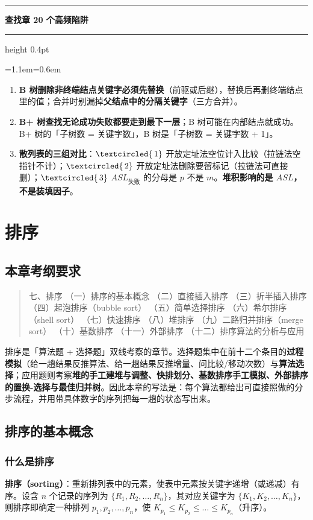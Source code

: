 \documentclass[11pt,openany,UTF8]{ctexbook}
\newcommand{\circled}[1]{\textcircled{\scriptsize\,#1}}
\newcommand{\callouthead}[2]{%
  \par\addvspace{7pt}\noindent
  {\color{#1}\rule[-0.15em]{3pt}{1.05em}}\hspace{0.5em}%
  {\bfseries\color{#1}#2}\par\nobreak\vspace{-0.35em}%
  {\color{rulesep}\hrule height 0.4pt}\nobreak\vspace{0.45em}%
  \begingroup\small\setlength{\parindent}{0pt}%
  \leftskip=1.1em\rightskip=0.6em\noindent\ignorespaces}
\newcommand{\calloutend}{\par\endgroup\addvspace{7pt}}
\newenvironment{callwarn}[1]{\callouthead{warnbar}{#1}}{\calloutend}
\begin{document}
\begin{callwarn}{查找章 20 个高频陷阱}
\begin{enumerate}
\item \textbf{B 树删除非终端结点关键字必须先替换}（前驱或后继），替换后再删终端结点里的值；合并时别漏掉\textbf{父结点中的分隔关键字}（三方合并）。
\item \textbf{B+ 树查找无论成功失败都要走到最下一层}；B 树可能在内部结点就成功。B+ 树的「子树数 = 关键字数」，B 树是「子树数 = 关键字数 + 1」。
\item \textbf{散列表的三组对比}：$\circled{1}$ 开放定址法空位计入比较（拉链法空指针不计）；$\circled{2}$ 开放定址法删除要留标记（拉链法可直接删）；$\circled{3}$ $ASL_{失败}$ 的分母是 $p$ 不是 $m$。\textbf{堆积影响的是 $ASL$，不是装填因子}。
\end{enumerate}
\end{callwarn}

\chapter{排序}
\section*{本章考纲要求}

\begin{quote}
七、排序 （一）排序的基本概念 （二）直接插入排序 （三）折半插入排序 （四）起泡排序（bubble sort） （五）简单选择排序 （六）希尔排序（shell sort） （七）快速排序 （八）堆排序 （九）二路归并排序（merge sort） （十）基数排序 （十一）外部排序 （十二）排序算法的分析与应用

\end{quote}
排序是「算法题 + 选择题」双线考察的章节。选择题集中在前十二个条目的\textbf{过程模拟}（给一趟结果反推算法、给一趟结果反推增量、问比较/移动次数）与\textbf{算法选择}；应用题则考察\textbf{堆的手工建堆与调整、快排划分、基数排序手工模拟、外部排序的置换-选择与最佳归并树}。因此本章的写法是：每个算法都给出可直接照做的分步流程，并用带具体数字的序列把每一趟的状态写出来。

\section{排序的基本概念}

\subsection{什么是排序}

\textbf{排序（sorting）}：重新排列表中的元素，使表中元素按关键字递增（或递减）有序。设含 $n$ 个记录的序列为 $\{R_1,R_2,\dots,R_n\}$，其对应关键字为 $\{K_1,K_2,\dots,K_n\}$，则排序即确定一种排列 $p_1,p_2,\dots,p_n$，使 $K_{p_1}\le K_{p_2}\le\dots\le K_{p_n}$（升序）。
\end{document}
